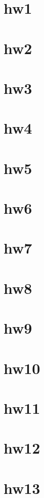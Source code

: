 \documentclass{mynote}
\begin{document}
\section{hw1}

\section{hw2}

\section{hw3}

\section{hw4}

\section{hw5}

\section{hw6}

\section{hw7}

\section{hw8}

\section{hw9}

\section{hw10}

\section{hw11}

\section{hw12}

\section{hw13}

\end{document}
